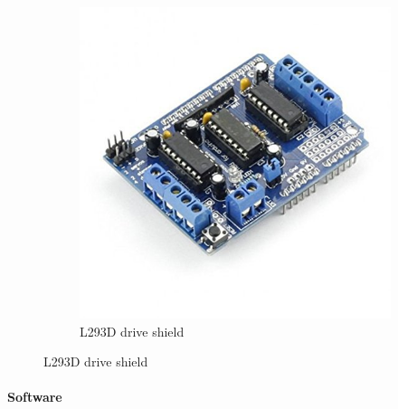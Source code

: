 \documentclass[11pt]{article}
\begin{document}
\begin{figure}[htp]
\begin{subfigure}[b]{0.4\textwidth}
		\includegraphics[width=\textwidth]{images/l293d.jpg}
		\caption{L293D drive shield}
	\label{fig:car}
	\end{subfigure}
\end{figure}
\paragraph{Software}
\end{document}
